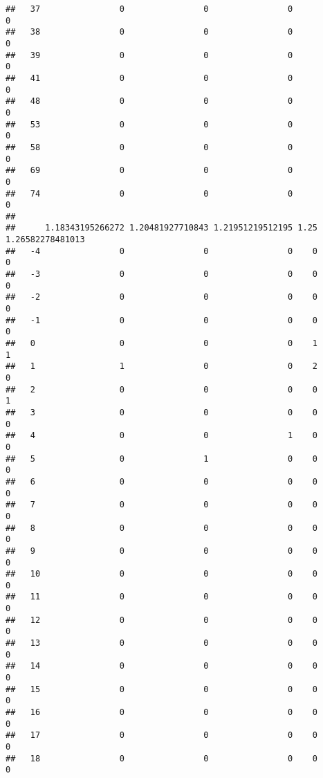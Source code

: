 \documentclass[]{article}
\begin{document}
\begin{verbatim}
##   37                0                0                0                0
##   38                0                0                0                0
##   39                0                0                0                0
##   41                0                0                0                0
##   48                0                0                0                0
##   53                0                0                0                0
##   58                0                0                0                0
##   69                0                0                0                0
##   74                0                0                0                0
##     
##      1.18343195266272 1.20481927710843 1.21951219512195 1.25 1.26582278481013
##   -4                0                0                0    0                0
##   -3                0                0                0    0                0
##   -2                0                0                0    0                0
##   -1                0                0                0    0                0
##   0                 0                0                0    1                1
##   1                 1                0                0    2                0
##   2                 0                0                0    0                1
##   3                 0                0                0    0                0
##   4                 0                0                1    0                0
##   5                 0                1                0    0                0
##   6                 0                0                0    0                0
##   7                 0                0                0    0                0
##   8                 0                0                0    0                0
##   9                 0                0                0    0                0
##   10                0                0                0    0                0
##   11                0                0                0    0                0
##   12                0                0                0    0                0
##   13                0                0                0    0                0
##   14                0                0                0    0                0
##   15                0                0                0    0                0
##   16                0                0                0    0                0
##   17                0                0                0    0                0
##   18                0                0                0    0                0

\end{verbatim}
\end{document}
